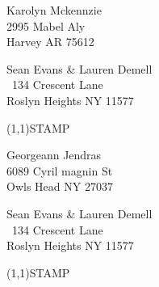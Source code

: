\documentclass[12pt]{article}
\begin{document}
\begin{center} \begin{Huge} \vspace*{\fill}
Karolyn Mckennzie\\
2995 Mabel Aly\\
Harvey AR 75612\\
\vspace{\fill} \end{Huge} \end{center}

\clearpage

\begin{minipage}{.5\linewidth} \noindent
Sean Evans \& Lauren Demell\\\ 
134 Crescent Lane\\ 
Roslyn Heights NY 11577
\end{minipage}
\begin{minipage}{.5\linewidth \hspace{-.2in} \vspace{-.3in}}
\begin{flushright}
\framebox(1,1){STAMP}
\end{flushright}
\end{minipage}

\begin{center} \begin{Huge} \vspace*{\fill}
Georgeann Jendras\\
6089 Cyril magnin St\\
Owls Head NY 27037\\
\vspace{\fill} \end{Huge} \end{center}

\clearpage

\begin{minipage}{.5\linewidth} \noindent
Sean Evans \& Lauren Demell\\\ 
134 Crescent Lane\\ 
Roslyn Heights NY 11577
\end{minipage}
\begin{minipage}{.5\linewidth \hspace{-.2in} \vspace{-.3in}}
\begin{flushright}
\framebox(1,1){STAMP}
\end{flushright}
\end{minipage}
\end{document}
